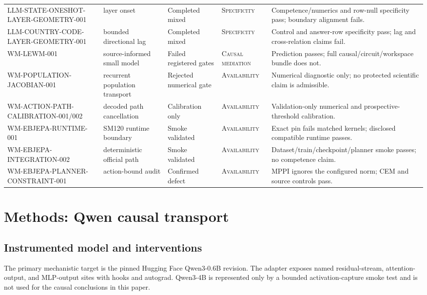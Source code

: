 \documentclass[10pt]{article}
\newcommand{\level}[1]{{\scriptsize\textsc{#1}}}
\begin{document}
\begin{table}[t]
\begin{tabularx}{\textwidth}{@{}p{3.2cm}p{2.45cm}p{2.05cm}p{1.9cm}Y@{}}
LLM-STATE-ONESHOT-LAYER-GEOMETRY-001 & layer onset & Completed mixed & \level{Specificity} & Competence/numerics and row-null specificity pass; boundary alignment fails. \\
LLM-COUNTRY-CODE-LAYER-GEOMETRY-001 & bounded directional lag & Completed mixed & \level{Specificity} & Control and answer-row specificity pass; lag and cross-relation claims fail. \\
WM-LEWM-001 & source-informed small model & Failed registered gates & \level{Causal mediation} & Prediction passes; full causal/circuit/workspace bundle does not. \\
WM-POPULATION-JACOBIAN-001 & recurrent population transport & Rejected numerical gate & \level{Availability} & Numerical diagnostic only; no protected scientific claim is admissible. \\
WM-ACTION-PATH-CALIBRATION-001/002 & decoded path cancellation & Calibration only & \level{Availability} & Validation-only numerical and prospective-threshold calibration. \\
WM-EBJEPA-RUNTIME-001 & SM120 runtime boundary & Smoke validated & \level{Availability} & Exact pin fails matched kernels; disclosed compatible runtime passes. \\
WM-EBJEPA-INTEGRATION-002 & deterministic official path & Smoke validated & \level{Availability} & Dataset/train/checkpoint/planner smoke passes; no competence claim. \\
WM-EBJEPA-PLANNER-CONSTRAINT-001 & action-bound audit & Confirmed defect & \level{Availability} & MPPI ignores the configured norm; CEM and source controls pass. \\
\bottomrule
\end{tabularx}
\end{table}

\section{Methods: Qwen causal transport}

\subsection{Instrumented model and interventions}

The primary mechanistic target is the pinned Hugging Face Qwen3-0.6B revision.
The adapter exposes named residual-stream, attention-output, and MLP-output
sites with hooks and autograd.  Qwen3-4B is represented only by a bounded
activation-capture smoke test and is not used for the causal conclusions in
this paper.
\end{document}
